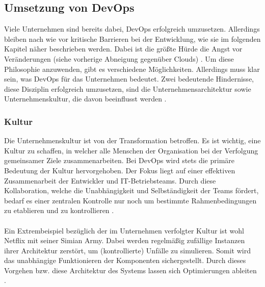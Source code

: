 \subsection{Umsetzung von DevOps}
Viele Unternehmen sind bereits dabei, DevOps erfolgreich umzusetzen. Allerdings bleiben nach wie vor kritische Barrieren bei der Entwicklung, wie sie im folgenden Kapitel näher beschrieben werden. Dabei ist die größte Hürde die Angst vor Veränderungen (siehe vorherige Abneigung gegenüber Clouds) \cite{continuousdelivery.2017}. Um diese Philosophie anzuwenden, gibt es verschiedene Möglichkeiten. Allerdings muss klar sein, was DevOps für das Unternehmen bedeutet. Zwei bedeutende Hindernisse, diese Disziplin erfolgreich umzusetzen, sind die Unternehmensarchitektur sowie Unternehmenskultur, die davon beeinflusst werden \cite{Wolff.2016}.

\subsubsection{Kultur}
Die Unternehmenskultur ist von der Transformation betroffen. Es ist wichtig, eine Kultur zu schaffen, in welcher alle Menschen der Organisation bei der Verfolgung gemeinsamer Ziele zusammenarbeiten. Bei DevOps wird stets die primäre Bedeutung der Kultur hervorgehoben. Der Fokus liegt auf einer effektiven Zusammenarbeit der Entwickler und IT-Betriebsteams. Durch diese Kollaboration, welche die Unabhängigkeit und Selbständigkeit der Teams fördert, bedarf es einer zentralen Kontrolle nur noch um bestimmte Rahmenbedingungen zu etablieren und zu kontrollieren \cite{Wolff.2016}.\\ \\    
Ein Extrembeispiel bezüglich der im Unternehmen verfolgter Kultur ist wohl Netflix mit seiner Simian Army. Dabei werden regelmäßig zufällige Instanzen ihrer Architektur zerstört, um (kontrollierte) Unfälle zu simulieren. Somit wird das unabhängige Funktionieren der Komponenten sichergestellt. Durch dieses Vorgehen bzw. diese Architektur des Systems lassen sich Optimierungen ableiten \cite{continuousdelivery.2017}.

